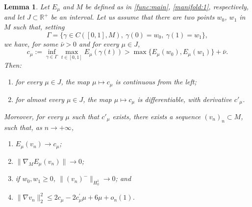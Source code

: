 \documentclass[10pt]{article}
\newtheorem{lemma}[proposition]{Lemma}
\theoremstyle{definition}
\numberwithin{equation}{section}
\begin{document}
\begin{lemma}\label{JJ:theo}
Let $E_\mu$ and $M$ be defined as in \eqref{func:main}, \eqref{manifold:1}, respectively,
and let $J\subset \mathbb{R}^{+}$ be an interval. Let us assume that there are two points
$w_{0}$, $w_{1}$ in $M$ such that, setting
\[
\Gamma=\{\gamma \in C([0,1],M), \ \gamma(0)=w_{0}, \ \gamma(1)=w_{1}\},
\]
we have, for some $\bar\nu>0$ and for every $\mu\in J$,
\[
c_{\mu}:=\inf\limits_{\gamma\in \Gamma}\max\limits_{t\in[0,1]}E_{\mu}(\gamma(t))> \max\{E_{\mu}(w_{0}),E_{\mu}(w_{1})\} + \bar \nu.
\]
Then:
\begin{enumerate}
\item for every $\mu\in J$, the map $\mu\mapsto c_\mu$ is continuous from the left;
\item for almost every $\mu\in J$, the map $\mu\mapsto c_\mu$ is differentiable, with
derivative $c'_\mu$.
\end{enumerate}
Moreover, for every $\mu$ such that $c'_\mu$ exists, there exists a sequence $(v_{n})_{n}\subset M$,
such that, as $n\to+\infty$,
\begin{enumerate}
\item\label{PS1} $E_{\mu}(v_{n})\rightarrow c_{\mu}$;
\item\label{PS2} $\|\nabla_M E_{\mu}(v_{n})\|\rightarrow 0$;
\item\label{positivejnjn} if $w_{0},w_{1}\geq0$, $\|(v_n)^{-}\|_{H^1_0}\to 0$; and
\item\label{boundjnjn} $\|\nabla v_{n}\|_{2}^{2} \le 2c_{\mu}-2c^{\prime}_{\mu}\mu
+6\mu +o_n(1)$.
\end{enumerate}
\end{lemma}
\end{document}
